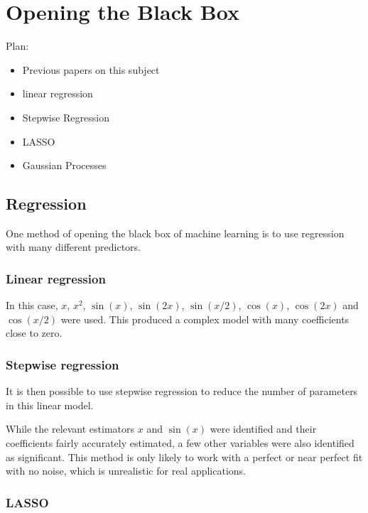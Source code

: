 
\chapter{Opening the Black Box}

Plan:
\begin{itemize}
	\item Previous papers on this subject
	\item linear regression
	\item Stepwise Regression
    \item LASSO
    \item Gaussian Processes
\end{itemize}

\section{Regression}

One method of opening the black box of machine learning is to use regression with many different predictors.

\subsection{Linear regression}

In this case, \(x\), \(x^2\), \(\sin(x)\), \(\sin(2x)\), \(\sin(x/2)\), \(\cos(x)\), \(\cos(2x)\) and \(\cos(x/2)\) were used.
This produced a complex model with many coefficients close to zero.


\subsection{Stepwise regression}

It is then possible to use stepwise regression to reduce the number of parameters in this linear model.


While the relevant estimators \(x\) and \(\sin(x)\) were identified and their coefficients fairly accurately estimated, a few other variables were also identified as significant.
This method is only likely to work with a perfect or near perfect fit with no noise, which is unrealistic for real applications.

\subsection{LASSO}


